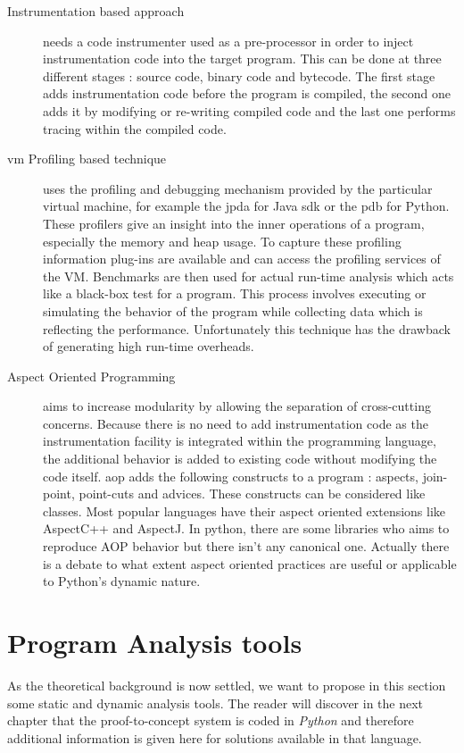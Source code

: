 \begin{description}
  \item[Instrumentation based approach] needs a code instrumenter used as a pre-processor in order to inject instrumentation code into the target program. This can be done at three different stages : source code, binary code and bytecode. The first stage adds instrumentation code before the program is compiled, the second one adds it by modifying or re-writing compiled code and the last one performs tracing within the compiled code.
  
  \item[\gls{vm} Profiling based technique] uses the profiling and debugging mechanism provided by the particular virtual machine, for example the \gls{jpda} for Java \gls{sdk} or the \gls{pdb} for Python. These profilers give an insight into the inner operations of a program, especially the memory and heap usage. To capture these profiling information plug-ins are available and can access the profiling services of the VM. Benchmarks are then used for actual run-time analysis which acts like a black-box test for a program. This process involves executing or simulating the behavior of the program while collecting data which is reflecting the performance. Unfortunately this technique has the drawback of generating high run-time overheads. 
  
  \item[Aspect Oriented Programming] aims to increase modularity by allowing the separation of cross-cutting concerns. Because there is no need to add instrumentation code as the instrumentation facility is integrated within the programming language, the additional behavior is added to existing code without modifying the code itself. \gls{aop} adds the following constructs to a program : aspects, join-point, point-cuts and advices. These constructs can be considered like classes. Most popular languages have their aspect oriented extensions like AspectC++ and AspectJ. In python, there are some libraries who aims to reproduce AOP behavior but there isn't any canonical one. Actually there is a debate to what extent aspect oriented practices are useful or applicable to Python's dynamic nature. %
  
\end{description}


\section{Program Analysis tools}
As the theoretical background is now settled, we want to propose in this section some static and dynamic analysis tools. The reader will discover in the next chapter that the proof-to-concept system is coded in \textit{Python} and therefore additional information is given here for solutions available in that language.

